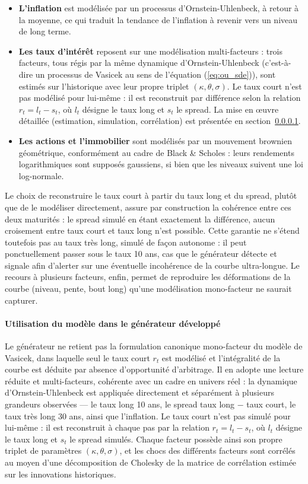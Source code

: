 \begin{itemize}
    \item \textbf{L'inflation} est modélisée par un processus d'Ornstein-Uhlenbeck, à retour à la moyenne, ce qui traduit la tendance de l'inflation à revenir vers un niveau de long terme.
    \item \textbf{Les taux d'intérêt} reposent sur une modélisation multi-facteurs : trois facteurs, tous régis par la même dynamique d'Ornstein-Uhlenbeck (c'est-à-dire un processus de Vasicek au sens de l'équation (\ref{eq:ou_sde})), sont estimés sur l'historique avec leur propre triplet $(\kappa, \theta, \sigma)$. Le taux court n'est pas modélisé pour lui-même : il est reconstruit par différence selon la relation $r_t = l_t - s_t$, où $l_t$ désigne le taux long et $s_t$ le spread. La mise en œuvre détaillée (estimation, simulation, corrélation) est présentée en section~\ref{sec:calibrage_monde_reel}.
    \item \textbf{Les actions et l'immobilier} sont modélisés par un mouvement brownien géométrique, conformément au cadre de Black \& Scholes : leurs rendements logarithmiques sont supposés gaussiens, si bien que les niveaux suivent une loi log-normale.
\end{itemize}

Le choix de reconstruire le taux court à partir du taux long et du spread, plutôt que de le modéliser directement, assure par construction la cohérence entre ces deux maturités : le spread simulé en étant exactement la différence, aucun croisement entre taux court et taux long n'est possible. Cette garantie ne s'étend toutefois pas au taux très long, simulé de façon autonome : il peut ponctuellement passer sous le taux 10 ans, cas que le générateur détecte et signale afin d'alerter sur une éventuelle incohérence de la courbe ultra-longue. Le recours à plusieurs facteurs, enfin, permet de reproduire les déformations de la courbe (niveau, pente, bout long) qu'une modélisation mono-facteur ne saurait capturer.

\paragraph{Utilisation du modèle dans le générateur développé}
\label{sec:calibrage_monde_reel}

Le générateur ne retient pas la formulation canonique mono-facteur du modèle de Vasicek, dans laquelle seul le taux court $r_t$ est modélisé et l'intégralité de la courbe est déduite par absence d'opportunité d'arbitrage. Il en adopte une lecture réduite et multi-facteurs, cohérente avec un cadre en univers réel : la dynamique d'Ornstein-Uhlenbeck est appliquée directement et séparément à plusieurs grandeurs observées — le taux long 10 ans, le spread taux long $-$ taux court, le taux très long 30 ans, ainsi que l'inflation. Le taux court n'est pas simulé pour lui-même : il est reconstruit à chaque pas par la relation $r_t = l_t - s_t$, où $l_t$ désigne le taux long et $s_t$ le spread simulés. Chaque facteur possède ainsi son propre triplet de paramètres $(\kappa, \theta, \sigma)$, et les chocs des différents facteurs sont corrélés au moyen d'une décomposition de Cholesky de la matrice de corrélation estimée sur les innovations historiques.

